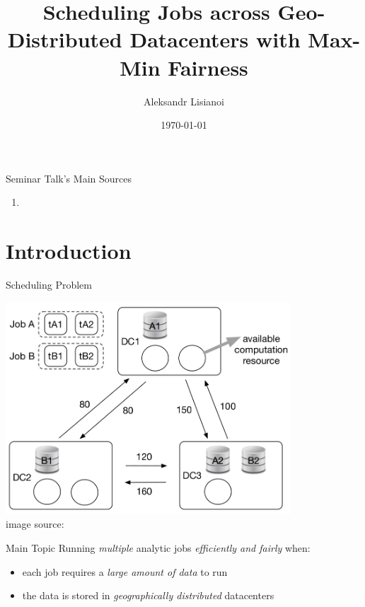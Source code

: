\documentclass[presentation,professionalfonts]{beamer}
\institute[TU Wien]{Seminar ``\semname''\\\semester}
\date{\today}
\title[Scheduling Jobs with Max-Min Fairness]{Scheduling Jobs across Geo-Distributed Datacenters with Max-Min Fairness}
\author[Aleksandr Lisianoi]{Aleksandr Lisianoi}
\begin{document}
\maketitle

\begin{frame}{Seminar Talk's Main Sources}
  \begin{enumerate}
  \item {}
  \end{enumerate}
\end{frame}



\section{Introduction}
\begin{frame}{Scheduling Problem}
  \begin{center}
  \includegraphics[width=0.8\textwidth]{fig1}\\
  image source: \textcite{Chen2017}
  \end{center}
\end{frame}

\begin{frame}{Main Topic}
  Running \emph{multiple} analytic jobs \emph{efficiently and fairly} when:
  \begin{itemize}
  \item each job requires a \emph{large amount of data} to run
  \item the data is stored in \emph{geographically distributed} datacenters
  \end{itemize}
\end{frame}
\end{document}
